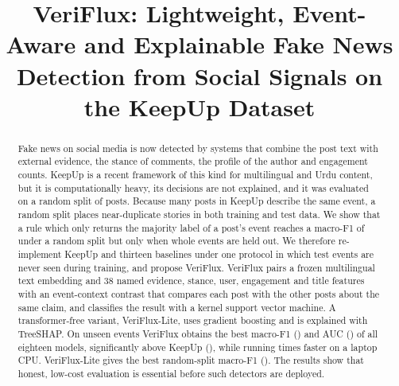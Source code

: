 \documentclass[conference]{IEEEtran}
\begin{document}
\title{VeriFlux: Lightweight, Event-Aware and Explainable Fake News Detection from Social Signals on the KeepUp Dataset}

\author{
\and
{}
}

\maketitle

\begin{abstract}
Fake news on social media is now detected by systems that combine the post text with external evidence,
the stance of comments, the profile of the author and engagement counts. KeepUp is a recent framework of this
kind for multilingual and Urdu content, but it is computationally heavy, its decisions are not explained, and
it was evaluated on a random split of posts. Because many posts in KeepUp describe the same event, a random
split places near-duplicate stories in both training and test data. We show that a rule which only returns the
majority label of a post's event reaches a macro-F1 of \LookupRandomFone{} under a random split but only
\LookupEventFone{} when whole events are held out. We therefore re-implement KeepUp and thirteen baselines
under one protocol in which test events are never seen during training, and propose VeriFlux. VeriFlux pairs a
frozen multilingual text embedding and 38 named evidence, stance, user, engagement and title features with an
event-context contrast that compares each post with the other posts about the same claim, and classifies the
result with a kernel support vector machine. A transformer-free variant, VeriFlux-Lite, uses gradient boosting
and is explained with TreeSHAP. On unseen events VeriFlux obtains the best macro-F1 (\VFeventFone{}) and AUC
(\VFeventAuc{}) of all eighteen models, significantly above KeepUp (\KUeventFone{}), while running
\LatencyRatio{} times faster on a laptop CPU. VeriFlux-Lite gives the best random-split macro-F1
(\VFLrandomFone{}). The results show that honest, low-cost evaluation is essential before such detectors are
deployed.
\end{abstract}
\end{document}
